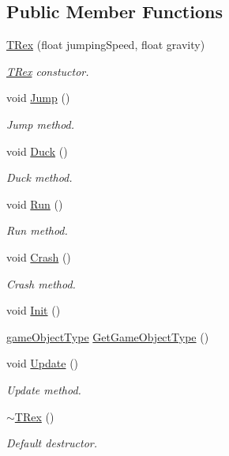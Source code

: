\subsection*{Public Member Functions}
\begin{DoxyCompactItemize}
\item 
\mbox{\hyperlink{class_t_rex_ae762432f9b24294e971b9f62191f26e9}{T\+Rex}} (float jumping\+Speed, float gravity)
\begin{DoxyCompactList}\small\item\em \mbox{\hyperlink{class_t_rex}{T\+Rex}} constuctor. \end{DoxyCompactList}\item 
void \mbox{\hyperlink{class_t_rex_abc238b8e1df77d79f259cadd3a6c4cc8}{Jump}} ()
\begin{DoxyCompactList}\small\item\em Jump method. \end{DoxyCompactList}\item 
void \mbox{\hyperlink{class_t_rex_a1e672bcdbbeab5bc66c1812e3be30fd3}{Duck}} ()
\begin{DoxyCompactList}\small\item\em Duck method. \end{DoxyCompactList}\item 
void \mbox{\hyperlink{class_t_rex_af0e9ccbecc23739201a85e489da81efd}{Run}} ()
\begin{DoxyCompactList}\small\item\em Run method. \end{DoxyCompactList}\item 
void \mbox{\hyperlink{class_t_rex_a8881cde6c1a996532fa34cdb413ac441}{Crash}} ()
\begin{DoxyCompactList}\small\item\em Crash method. \end{DoxyCompactList}\item 
void \mbox{\hyperlink{class_t_rex_a9975357a104130b3b8f6c5ed65f2eb0e}{Init}} ()
\item 
\mbox{\hyperlink{class_game_object_ad5092169e581fb0772e01026882ea0c8}{game\+Object\+Type}} \mbox{\hyperlink{class_t_rex_ae376c4623c619940213ea75f57d721d5}{Get\+Game\+Object\+Type}} ()
\item 
void \mbox{\hyperlink{class_t_rex_aaef538213b79fb870e8af8f0cdf39a14}{Update}} ()
\begin{DoxyCompactList}\small\item\em Update method. \end{DoxyCompactList}\item 
\mbox{\hyperlink{class_t_rex_a55dbaec9e6c442749133aaf017675c02}{$\sim$\+T\+Rex}} ()
\begin{DoxyCompactList}\small\item\em Default destructor. \end{DoxyCompactList}\end{DoxyCompactItemize}
